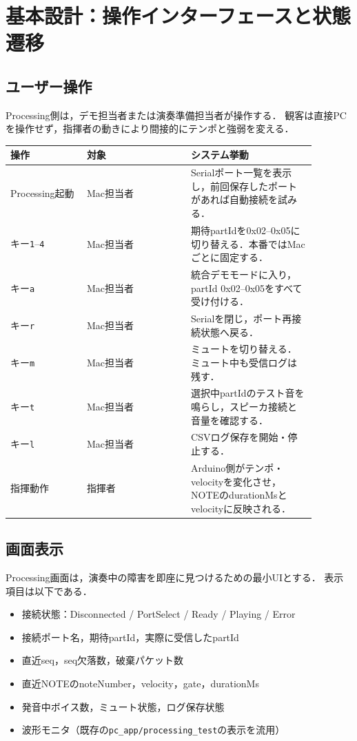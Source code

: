 \documentclass[a4paper,11pt]{jsarticle}
\begin{document}
\newpage
\section{基本設計：操作インターフェースと状態遷移}

\subsection{ユーザー操作}

Processing側は，デモ担当者または演奏準備担当者が操作する．
観客は直接PCを操作せず，指揮者の動きにより間接的にテンポと強弱を変える．

\begin{longtable}{p{0.22\linewidth}p{0.30\linewidth}p{0.36\linewidth}}
\toprule
操作 & 対象 & システム挙動 \\
\midrule
\endhead
Processing起動 & Mac担当者 & Serialポート一覧を表示し，前回保存したポートがあれば自動接続を試みる． \\
キー\texttt{1}--\texttt{4} & Mac担当者 & 期待partIdを0x02--0x05に切り替える．本番ではMacごとに固定する． \\
キー\texttt{a} & Mac担当者 & 統合デモモードに入り，partId 0x02--0x05をすべて受け付ける． \\
キー\texttt{r} & Mac担当者 & Serialを閉じ，ポート再接続状態へ戻る． \\
キー\texttt{m} & Mac担当者 & ミュートを切り替える．ミュート中も受信ログは残す． \\
キー\texttt{t} & Mac担当者 & 選択中partIdのテスト音を鳴らし，スピーカ接続と音量を確認する． \\
キー\texttt{l} & Mac担当者 & CSVログ保存を開始・停止する． \\
指揮動作 & 指揮者 & Arduino側がテンポ・velocityを変化させ，NOTEのdurationMsとvelocityに反映される． \\
\bottomrule
\end{longtable}

\subsection{画面表示}

Processing画面は，演奏中の障害を即座に見つけるための最小UIとする．
表示項目は以下である．

\begin{itemize}
\item 接続状態：Disconnected / PortSelect / Ready / Playing / Error
\item 接続ポート名，期待partId，実際に受信したpartId
\item 直近seq，seq欠落数，破棄パケット数
\item 直近NOTEのnoteNumber，velocity，gate，durationMs
\item 発音中ボイス数，ミュート状態，ログ保存状態
\item 波形モニタ（既存の\texttt{pc\_app/processing\_test}の表示を流用）
\end{itemize}
\end{document}
